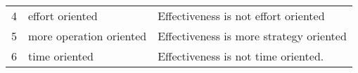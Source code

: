 \documentclass[10pt]{article}
\begin{document}
{\begin{tabular}{cll}
\multicolumn{1}{c|}{4} & \multicolumn{1}{l|}{effort oriented}                                                                                                                                                                                                  & \multicolumn{1}{l|}{Effectiveness is not effort oriented}                                                                                                                    \\ \cline{2-3} 
\multicolumn{1}{c|}{5} & \multicolumn{1}{l|}{more operation oriented}                                                                                                                                                                                          & \multicolumn{1}{l|}{Effectiveness is more strategy oriented}                                                                                                                 \\ \cline{2-3} 
\multicolumn{1}{c|}{6} & \multicolumn{1}{l|}{time oriented}                                                                                                                                                                                                    & \multicolumn{1}{l|}{Effectiveness is not time oriented.}                                                                                                                     \\ \cline{2-3} 
\end{tabular}%
}
\end{document}
